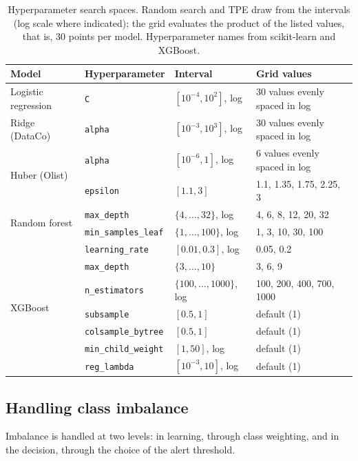 \documentclass[11pt,a4paper]{article}
\theoremstyle{definition}
\begin{document}
\begin{table}[!htbp]
\centering
\footnotesize
\caption{Hyperparameter search spaces. Random search and TPE draw from the intervals (log scale where indicated); the grid evaluates the product of the listed values, that is, 30 points per model. Hyperparameter names from scikit-learn and XGBoost.}
\label{tab:espaces}
\begin{tabular}{@{}llll@{}}
\toprule
Model & Hyperparameter & Interval & Grid values \\
\midrule
Logistic regression & \texttt{C} & $[10^{-4}, 10^{2}]$, log & 30 values evenly spaced in log \\
Ridge (DataCo) & \texttt{alpha} & $[10^{-3}, 10^{3}]$, log & 30 values evenly spaced in log \\
\multirow{2}{*}{Huber (Olist)} & \texttt{alpha} & $[10^{-6}, 1]$, log & 6 values evenly spaced in log \\
 & \texttt{epsilon} & $[1.1, 3]$ & 1.1, 1.35, 1.75, 2.25, 3 \\
\midrule
\multirow{2}{*}{Random forest} & \texttt{max\_depth} & $\{4, \dots, 32\}$, log & 4, 6, 8, 12, 20, 32 \\
 & \texttt{min\_samples\_leaf} & $\{1, \dots, 100\}$, log & 1, 3, 10, 30, 100 \\
\midrule
\multirow{7}{*}{XGBoost} & \texttt{learning\_rate} & $[0.01, 0.3]$, log & 0.05, 0.2 \\
 & \texttt{max\_depth} & $\{3, \dots, 10\}$ & 3, 6, 9 \\
 & \texttt{n\_estimators} & $\{100, \dots, 1000\}$, log & 100, 200, 400, 700, 1000 \\
 & \texttt{subsample} & $[0.5, 1]$ & default (1) \\
 & \texttt{colsample\_bytree} & $[0.5, 1]$ & default (1) \\
 & \texttt{min\_child\_weight} & $[1, 50]$, log & default (1) \\
 & \texttt{reg\_lambda} & $[10^{-3}, 10]$, log & default (1) \\
\bottomrule
\end{tabular}
\end{table}

\subsection{Handling class imbalance}
\label{sec:imbalance}

Imbalance is handled at two levels: in learning, through class weighting, and in the decision, through the choice of the alert threshold.
\end{document}
